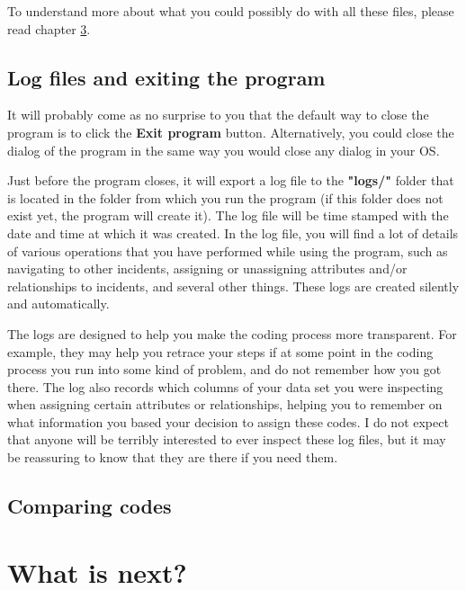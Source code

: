 \documentclass{memoir}
\begin{document}
To understand more about what you could possibly do with all these files, please read chapter \ref{chap:whatisnext}.


\section{Log files and exiting the program}
\label{sec:logfilesandexiting}

It will probably come as no surprise to you that the default way to close the program is to click the \textbf{Exit program} button. Alternatively, you could close the dialog of the program in the same way you would close any dialog in your OS.

Just before the program closes, it will export a log file to the \textbf{"logs/"} folder that is located in the folder from which you run the program (if this folder does not exist yet, the program will create it). The log file will be time stamped with the date and time at which it was created. In the log file, you will find a lot of details of various operations that you have performed while using the program, such as navigating to other incidents, assigning or unassigning attributes and/or relationships to incidents, and several other things. These logs are created silently and automatically.

The logs are designed to help you make the coding process more transparent. For example, they may help you retrace your steps if at some point in the coding process you run into some kind of problem, and do not remember how you got there. The log also records which columns of your data set you were inspecting when assigning certain attributes or relationships, helping you to remember on what information you based your decision to assign these codes. I do not expect that anyone will be terribly interested to ever inspect these log files, but it may be reassuring to know that they are there if you need them.  


\section{Comparing codes}
\label{sec:comparingcodes}



\chapter{What is next?}
\label{chap:whatisnext}
\end{document}
